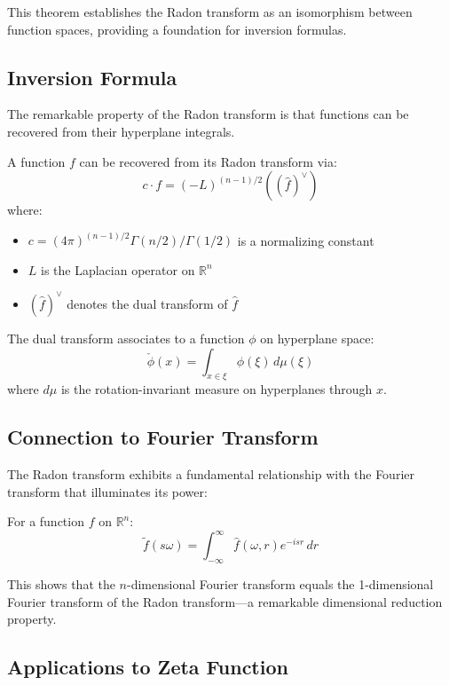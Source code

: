 This theorem establishes the Radon transform as an isomorphism between function spaces, providing a foundation for inversion formulas.

\subsection{Inversion Formula}

The remarkable property of the Radon transform is that functions can be recovered from their hyperplane integrals.

\begin{theorem}
A function $f$ can be recovered from its Radon transform via:
$$c \cdot f = (-L)^{(n-1)/2}((\hat{f})^{\vee})$$
where:
\begin{itemize}
\item $c = (4\pi)^{(n-1)/2}\Gamma(n/2)/\Gamma(1/2)$ is a normalizing constant
\item $L$ is the Laplacian operator on $\mathbb{R}^n$
\item $(\hat{f})^{\vee}$ denotes the dual transform of $\hat{f}$
\end{itemize}
\end{theorem}

The dual transform associates to a function $\phi$ on hyperplane space:
$$\check{\phi}(x) = \int_{x \in \xi} \phi(\xi) \, d\mu(\xi)$$
where $d\mu$ is the rotation-invariant measure on hyperplanes through $x$.

\subsection{Connection to Fourier Transform}

The Radon transform exhibits a fundamental relationship with the Fourier transform that illuminates its power:

\begin{theorem}
For a function $f$ on $\mathbb{R}^n$:
$$\tilde{f}(s\omega) = \int_{-\infty}^{\infty} \hat{f}(\omega,r) e^{-isr} \, dr$$
\end{theorem}

This shows that the $n$-dimensional Fourier transform equals the 1-dimensional Fourier transform of the Radon transform—a remarkable dimensional reduction property.

\subsection{Applications to Zeta Function}


